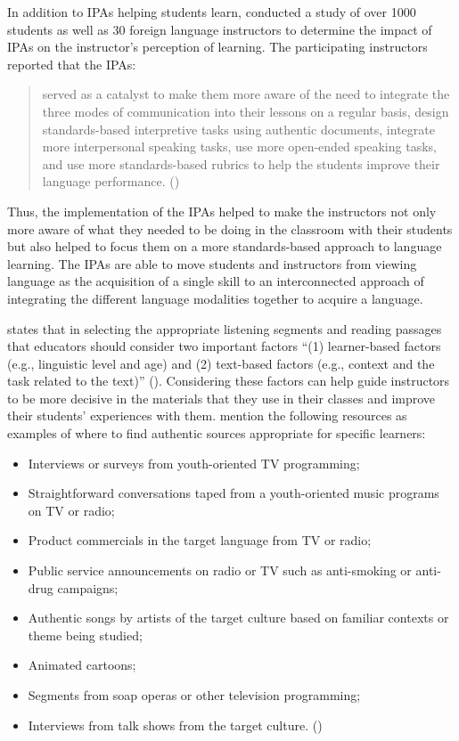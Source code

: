\documentclass[output=paper]{langscibook}
\begin{document}
In addition to IPAs helping students learn, \citet{Adair-HauckEtAl2006} conducted a study of over 1000 students as well as 30 foreign language instructors to determine the impact of IPAs on the instructor’s perception of learning. The participating instructors reported that the IPAs:

\begin{quote}
served as a catalyst to make them more aware of the need to integrate the three modes of communication into their lessons on a regular basis, design standards-based interpretive tasks using authentic documents, integrate more interpersonal speaking tasks, use more open-ended speaking tasks, and use more standards-based rubrics to help the students improve their language performance. (\citeyear[373]{Adair-HauckEtAl2006})
\end{quote}

Thus, the implementation of the IPAs helped to make the instructors not only more aware of what they needed to be doing in the classroom with their students but also helped to focus them on a more standards-based approach to language learning. The IPAs are able to move students and instructors from viewing language as the acquisition of a single skill to an interconnected approach of integrating the different language modalities together to acquire a language.

\citet{Troyan2016} states that in selecting the appropriate listening segments and reading passages that educators should consider two important factors “(1) learn\-er-based factors (e.g., linguistic level and age) and (2) text-based factors (e.g., context and the task related to the text)” (\cite[171]{Troyan2016}). Considering these factors can help guide instructors to be more decisive in the materials that they use in their classes and improve their students’ experiences with them. \citet{Adair-HauckTroyan2013} mention the following resources as examples of where to find authentic sources appropriate for specific learners:

\begin{itemize}
\item Interviews or surveys from youth-oriented TV programming;
\item \begin{sloppypar}Straightforward conversations taped from a youth-oriented music pro\-grams on TV or radio;\end{sloppypar}
\item Product commercials in the target language from TV or radio;
\item Public service announcements on radio or TV such as anti-smoking or anti-drug campaigns;
\item Authentic songs by artists of the target culture based on familiar contexts or theme being studied;
\item Animated cartoons;
\item Segments from soap operas or other television programming;
\item Interviews from talk shows from the target culture. (\citeyear[34]{Troyan2016})
\end{itemize}
\end{document}
